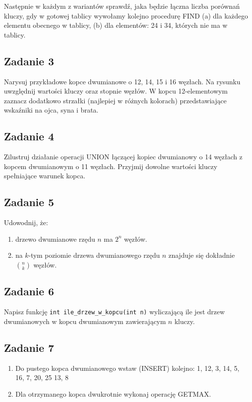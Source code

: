 \documentclass{article}
\begin{document}
\noindent
Następnie w każdym z wariantów sprawdź, jaka będzie łączna liczba porównań kluczy, gdy w gotowej tablicy wywołamy
kolejno procedurę FIND (a) dla każdego elementu obecnego w tablicy, (b) dla elementów: 24 i 34, których nie ma w tablicy.

\subsection*{Zadanie 3}
Narysuj przykładowe kopce dwumianowe o 12, 14, 15 i 16 węzłach. Na rysunku uwzględnij wartości kluczy oraz stopnie
węzłów. W kopcu 12-elementowym zaznacz dodatkowo strzałki (najlepiej w różnych kolorach) przedstawiające wskaźniki
na ojca, syna i brata.

\subsection*{Zadanie 4}
Zilustruj działanie operacji UNION łączącej kopiec dwumianowy o 14 węzłach z kopcem
dwumianowym o 11 węzłach. Przyjmij dowolne wartości kluczy spełniające warunek kopca.

\subsection*{Zadanie 5}
Udowodnij, że:
\begin{enumerate}[label=(\alph*)]
	\item drzewo dwumianowe rzędu $n$ ma $2^n$ węzłów.
	\item na $k$-tym poziomie drzewa dwumianowego rzędu $n$ znajduje się dokładnie $n \choose k$ węzłów.
\end{enumerate}

\subsection*{Zadanie 6}
Napisz funkcję \verb`int ile_drzew_w_kopcu(int n)` wyliczającą ile jest drzew dwumianowych w kopcu
dwumianowym zawierającym $n$ kluczy.

\subsection*{Zadanie 7}
\begin{enumerate}[label=(\alph*)]
	\item Do pustego kopca dwumianowego wstaw (INSERT) kolejno: 1, 12, 3, 14, 5, 16, 7, 20, 25 13, 8
	\item Dla otrzymanego kopca dwukrotnie wykonaj operację GETMAX.
\end{enumerate}
\end{document}
